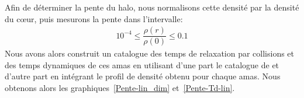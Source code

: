 

				Afin de déterminer la pente du halo, nous
				normalisons cette densité par la densité du cœur, puis mesurons la
				pente dans l'intervalle: %
				\begin{align*}
					10^{-4} \leq \dfrac{\rho(r)}{\rho(0)} \leq 0.1
				\end{align*}
				Nous avons alors construit un catalogue des temps de relaxation par
				collisions et des temps dynamiques de ces amas en utilisant d'une part le catalogue de
				\cite{Harris} et d'autre part en intégrant le profil de densité obtenu
				pour chaque amas.
				Nous obtenons alors les graphiques~\ref{Pente-lin_dim} et~\ref{Pente-Td-lin}.

